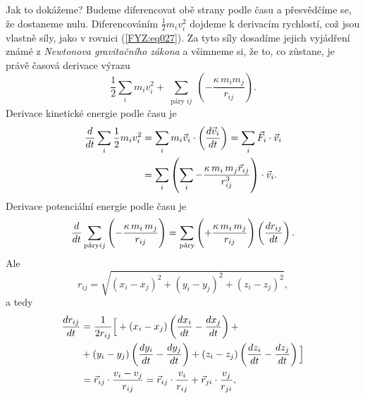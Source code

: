     Jak to dokážeme? Budeme diferencovat obě strany podle času a přesvědčíme se, že dostaneme nulu. 
    Diferencováním \(\frac{1}{2}m_iv_i^2\) dojdeme k derivacím rychlostí, což jsou vlastně síly, 
    jako v rovnici (\ref{FYZ:eq027}). Za tyto síly dosadíme jejich vyjádření známé z 
    \emph{Newtonova gravitačního zákona} a všimneme si, že to, co zůstane, je právě časová derivace 
    výrazu
    \begin{equation*}
      \frac{1}{2}\sum_im_iv_i^2 + 
      \sum_{\substack{\text{páry } ij}}\left(-\frac{\kappa\,m_im_j}{r_{ij}}\right).
    \end{equation*}
    Derivace kinetické energie podle času je
    \begin{align}
      \dfrac{d  }{d t}\sum_{\substack{i}}\frac{1}{2}m_iv_i^2 &=
                \sum_{\substack{i}}m_i\vec{v}_i\cdot\left(\dfrac{d \vec{v}_i}{d t}\right)  
              = \sum_{\substack{i}}\vec{F}_i\cdot\vec{v}_i                           \nonumber \\
             &= \sum_{\substack{i}}\left(\sum_{\substack{i}}
               -\frac{\kappa\,m_i\,m_j\vec{r}_{ij}}{r_{ij}^3}\right)\cdot\vec{v}_i.  
                \label{FYZ:eq040}
    \end{align}
    Derivace potenciální energie podle času je
    \begin{equation}\label{FYZ:eq041}
      \dfrac{d  }{d t}\sum_{\substack{\text{páry}} ij}\left(-\frac{\kappa\,m_i\,m_j}{r_{ij}}\right) =
                \sum_{\substack{\text{páry}}}\left(+\frac{\kappa\,m_i\,m_j}{r_{ij}}\right)
                     \left(\dfrac{d r_{ij}}{d t}\right).
    \end{equation}
    Ale
    \begin{equation}\label{FYZ:eq042}
      r_{ij} = \sqrt{(x_i - x_j)^2 + (y_i - y_j)^2 + (z_i - z_j)^2},
    \end{equation}
    a tedy
    \begin{align}
      \dfrac{d r_{ij}}{d t} 
        &= \frac{1}{2r_{ij}}
        \Big[\Big.
         + (x_i - x_j)\left(\dfrac{d x_i}{d t} - \dfrac{d x_j}{d t}\right) +  \nonumber \\ 
        &+ (y_i - y_j)\left(\dfrac{d y_i}{d t} - \dfrac{d y_j}{d t}\right) 
         + (z_i - z_j)\left(\dfrac{d z_i}{d t} - \dfrac{d z_j}{d t}\right)    
        \Big.\Big]                                                \nonumber  \\
        &= \vec{r}_{ij}\cdot\frac{v_i - v_j}{r_{ij}} 
         = \vec{r}_{ij}\cdot\frac{v_i}{r_{ij}} + \vec{r}_{ji}\cdot\frac{v_j}{r_{ji}},
    \end{align}
